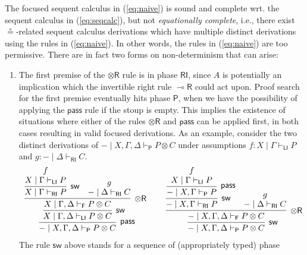 \documentclass[submission,copyright,creativecommons]{eptcs}
\theoremstyle{definition}
\newcommand{\tr}{\otimes \mathsf{R}}
\newcommand{\lright}{{\multimap}\mathsf{R}}
\newcommand{\pass}{\mathsf{pass}}
\newcommand{\ot}{\otimes}
\newcommand{\RI}{\mathsf{RI}}
\newcommand{\LI}{\mathsf{LI}}
\newcommand{\Pass}{\mathsf{P}}
\newcommand{\F}{\mathsf{F}}
\newcommand{\proofbox}[1]{\begin{tabular}{l} #1 \end{tabular}}
\begin{document}
The focused sequent calculus in (\ref{eq:naive}) is sound and complete wrt. the sequent calculus in (\ref{eq:seqcalc}), but not \emph{equationally complete}, i.e., there exist $\circeq$-related sequent calculus derivations which have multiple distinct derivations using the rules in (\ref{eq:naive}). In other words, the rules in (\ref{eq:naive}) are too permissive. There are in fact two forms on non-determinism that can arise:
\begin{enumerate}
\item The first premise of the $\tr$ rule is in phase $\RI$, since $A$ is potentially an implication which the invertible right rule $\lright$ could act upon. Proof search for the first premise eventually hits phase $\Pass$, when we have the possibility of applying the $\pass$ rule if the stoup is empty. This implies the existence of situations where either of the rules $\tr$ and $\pass$ can be applied first, in both cases resulting in valid focused derivations. 
  As an example, consider the two distinct derivations of $- \mid X , \Gamma , \Delta \vdash_{\Pass} P \ot C$ under assumptions $f : X \mid \Gamma \vdash_{\LI} P$ and $g : - \mid \Delta \vdash_{\RI} C$.
  \begin{equation}\label{eq:passtr}
    \proofbox{
      \infer[\pass]{- \mid X , \Gamma , \Delta \vdash_{\Pass} P \ot C}{
        \infer[\mathsf{sw}]{X \mid \Gamma , \Delta \vdash_{\LI} P \ot C}{
          \infer[\tr]{X \mid \Gamma , \Delta \vdash_{\F} P \ot C}{
            \infer[\mathsf{sw}]{X \mid \Gamma \vdash_{\RI} P}{
              \deduce{X \mid \Gamma \vdash_{\LI} P}{f}
            }
            &
            \deduce{- \mid \Delta \vdash_{\RI} C}{g}
          }
        }
      }
    \qquad
    \infer[\mathsf{sw}]{- \mid X , \Gamma , \Delta \vdash_{\Pass} P \ot C}{
      \infer[\tr]{- \mid X , \Gamma , \Delta \vdash_{\F} P \ot C}{
        \infer[\mathsf{sw}]{- \mid X , \Gamma \vdash_{\RI} P}{
          \infer[\pass]{- \mid X , \Gamma \vdash_{\Pass} P}{
            \deduce{X \mid \Gamma \vdash_{\LI} P}{f}
          }
        }
        &
        \deduce{- \mid \Delta \vdash_{\RI} C}{g}
      }
    }
    }
  \end{equation}
  The rule $\mathsf{sw}$ above stands for a sequence of (appropriately typed) phase

\end{enumerate}
\end{document}
